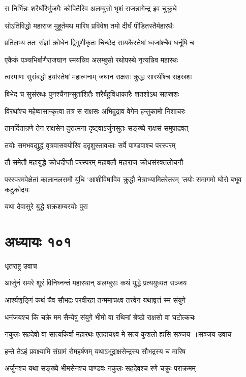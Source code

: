 \twolineshloka
{स निर्भिन्नः शरैर्घोरैर्भुजगैः कोपितैरिव}
{अलम्बुसो भृशं राजन्नागेन्द्र इव चुक्रुधे}


\twolineshloka
{सोऽतिविद्धो महाराज मुहूर्तमथ मारिष}
{प्रविवेश तमो दीर्घं पीडितस्तैर्महारथैः}


\twolineshloka
{प्रतिलभ्य ततः संज्ञां क्रोधेन द्विगुणीकृतः}
{चिच्छेद सायकैस्तेषां ध्वजांश्चैव धनूंषि च}


\twolineshloka
{एकैकं पञ्चभिर्बाणैराजघान स्मयन्निव}
{अलम्बुसो रथोपस्थे नृत्यन्निव महारथः}


\twolineshloka
{त्वरमाणः सुसंबद्धो हयांस्तेषां महात्मनाम्}
{जघान राक्षसः क्रुद्धः सारथींश्च सहस्रशः}


\twolineshloka
{बिभेद च सुसंरब्धः पुनश्चैनान्सुतांशितैः}
{शरैर्बहुविधाकारैः शतशोऽथ सहस्रशः}


\twolineshloka
{विरथांश्च महेष्वासान्कृत्वा तत्र स राक्षसः}
{अभिदुद्राव वेगेन हन्तुकामो निशाचरः}


\twolineshloka
{तानर्दितान्रणे तेन राक्षसेन दुरात्मना}
{दृष्ट्वाऽर्जुनसुतः सङ्ख्ये राक्षसं समुपाद्रवत्}


\twolineshloka
{तयोः समभवद्युद्धं वृत्रवासवयोरिव}
{ददृशुस्तावकाः सर्वे पाण्डवाश्च परस्परम्}


\twolineshloka
{तौ समेतौ महायुद्धे क्रोधदीप्तौ परस्परम्}
{महाबलौ महाराज क्रोधसंरक्तलोचनौ}


\threelineshloka
{परस्परमवेक्षेतां कालानलसमौ युधि}
{`आशीविषाविव क्रुद्धौ नेत्राभ्यामितरेतरम्}
{'तयोः समागमो घोरो बभूव कटुकोदयः}


यथा देवासुरे युद्धे शक्रशम्बरयोः पुरा
\chapter{अध्यायः १०१}
\twolineshloka
{धृतराष्ट्र उवाच}
{}


\twolineshloka
{आर्जुनं समरे शूरं विनिघ्नन्तं महारथान्}
{अलम्बुसः कथं युद्धे प्रत्ययुध्यत सञ्जय}


\twolineshloka
{आर्श्यशृङ्गिं कथं चैव सौभद्रः परवीरहा}
{तन्ममाचक्ष्व तत्त्वेन यथावृत्तं स्म संयुगे}


\twolineshloka
{धनंजयश्च किं चक्रे मम सैन्येषु संयुगे}
{भीमो वा रथिनां श्रेष्ठो राक्षसो वा घटोत्कचः}


\threelineshloka
{नकुलः सहदेवो वा सात्यकिर्वा महारथः}
{एतदाचक्ष्व मे सत्यं कुशलो ह्यसि सञ्जय ॥सञ्जय उवाच}
{}


\twolineshloka
{हन्ते तेऽहं प्रवक्ष्यामि संग्रामं रोमहर्षणम्}
{यथाऽभूद्राक्षसेन्द्रस्य सौभद्रस्य च मारिष}


\twolineshloka
{अर्जुनश्च यथा सङ्ख्ये भीमसेनश्च पाण्डवः}
{नकुलः सहदेवश्च रणे चक्रुः पराक्रमम्}


